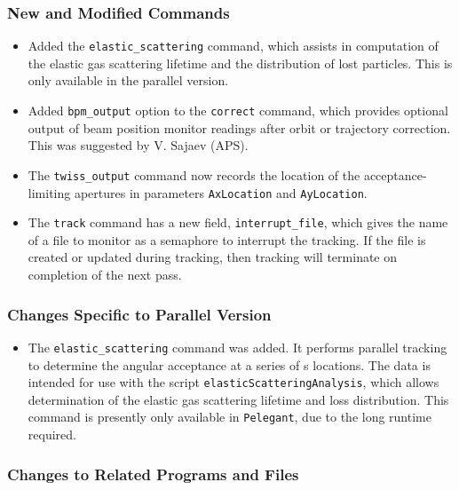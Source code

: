 \documentclass[11pt]{article}
\begin{document}
\subsubsection{New and Modified Commands}
\begin{itemize}
\item Added the \verb|elastic_scattering| command, which assists in computation of the elastic gas scattering
  lifetime and the distribution of lost particles. This is only available in the parallel version.
\item Added \verb|bpm_output| option to the \verb|correct| command, which provides optional output of beam position monitor
  readings after orbit or trajectory correction. This was suggested by V. Sajaev (APS).
\item The \verb|twiss_output| command now records the location of the acceptance-limiting apertures in parameters
  \verb|AxLocation| and \verb|AyLocation|.
\item The \verb|track| command has a new field, \verb|interrupt_file|, which gives the name of a file to monitor
  as a semaphore to interrupt the tracking. If the file is created or updated during tracking, then tracking will
  terminate on completion of the next pass.
\end{itemize}

\subsubsection{Changes Specific to Parallel Version}

\begin{itemize}
\item The \verb|elastic_scattering| command was added. It performs parallel tracking to determine the angular
  acceptance at a series of s locations. The data is intended for use with the script {\tt elasticScatteringAnalysis},
  which allows determination of the elastic gas scattering lifetime and loss distribution.
  This command is presently only available in \verb|Pelegant|, due to the long runtime required.
\end{itemize}

\subsubsection{Changes to Related Programs and Files}
\end{document}
